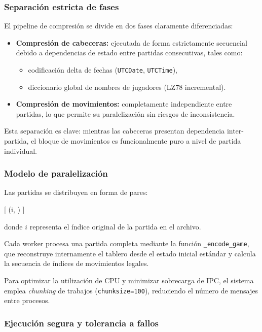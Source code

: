\documentclass[11pt, letterpaper]{article}
\begin{document}
\subsubsection{Separación estricta de fases}

El pipeline de compresión se divide en dos fases claramente diferenciadas:

\begin{itemize}
\item \textbf{Compresión de cabeceras:} ejecutada de forma estrictamente secuencial debido a dependencias de estado entre partidas consecutivas, tales como:
\begin{itemize}
\item codificación delta de fechas (\texttt{UTCDate}, \texttt{UTCTime}),
\item diccionario global de nombres de jugadores (LZ78 incremental).
\end{itemize}

\item \textbf{Compresión de movimientos:} completamente independiente entre partidas, lo que permite su paralelización sin riesgos de inconsistencia.

\end{itemize}

Esta separación es clave: mientras las cabeceras presentan dependencia inter-partida, el bloque de movimientos es funcionalmente puro a nivel de partida individual.

\subsubsection{Modelo de paralelización}

Las partidas se distribuyen en forma de pares:

[
(i, )
]

donde $i$ representa el índice original de la partida en el archivo.

Cada worker procesa una partida completa mediante la función \texttt{\_encode\_game}, que reconstruye internamente el tablero desde el estado inicial estándar y calcula la secuencia de índices de movimientos legales.

Para optimizar la utilización de CPU y minimizar sobrecarga de IPC, el sistema emplea \textit{chunking} de trabajos (\texttt{chunksize=100}), reduciendo el número de mensajes entre procesos.

\subsubsection{Ejecución segura y tolerancia a fallos}
\end{document}
